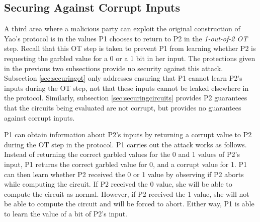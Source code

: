 \subsection{Securing Against Corrupt Inputs}

A third area where a malicious party can exploit the original construction of Yao's protocol is in the values \ac{P1} chooses to return to \ac{P2} in the \emph{1-out-of-2 \ac{OT}} step.  Recall that this \ac{OT} step is taken to prevent \ac{P1} from learning whether \ac{P2} is requesting the garbled value for a 0 or a 1 bit in her input.  The protections given in the previous two subsections provide no security against this attack. Subsection \ref{sec:securingot} only addresses ensuring that \ac{P1} cannot learn \ac{P2}'s inputs during the \ac{OT} step, not that these inputs cannot be leaked elsewhere in the protocol.  Similarly, subsection \ref{sec:securingcircuits} provides \ac{P2} guarantees that the circuits being evaluated are not corrupt, but provides no guarantees against corrupt inputs.

\ac{P1} can obtain information about \ac{P2}'s inputs by returning a corrupt value to \ac{P2} during the \ac{OT} step in the protocol.  \ac{P1} carries out the attack works as follows.  Instead of returning the correct garbled values for the 0 and 1 values of \ac{P2}'s input, \ac{P1} returns the correct garbled value for 0, and a corrupt value for 1.  \ac{P1} can then learn whether \ac{P2} received the 0 or 1 value by observing if \ac{P2} aborts while computing the circuit.  If \ac{P2} received the 0 value, she will be able to compute the circuit as normal.  However, if \ac{P2} received the 1 value, she will not be able to compute the circuit and will be forced to abort.  Either way, \ac{P1} is able to learn the value of a bit of \ac{P2}'s input.

